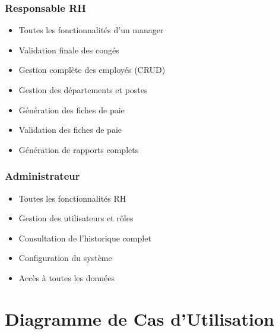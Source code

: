 \documentclass[12pt,a4paper,twoside]{report}
\begin{document}
\subsubsection{Responsable RH}
\begin{itemize}
    \item Toutes les fonctionnalités d'un manager
    \item Validation finale des congés
    \item Gestion complète des employés (CRUD)
    \item Gestion des départements et postes
    \item Génération des fiches de paie
    \item Validation des fiches de paie
    \item Génération de rapports complets
\end{itemize}

\subsubsection{Administrateur}
\begin{itemize}
    \item Toutes les fonctionnalités RH
    \item Gestion des utilisateurs et rôles
    \item Consultation de l'historique complet
    \item Configuration du système
    \item Accès à toutes les données
\end{itemize}

\section{Diagramme de Cas d'Utilisation}
\end{document}
